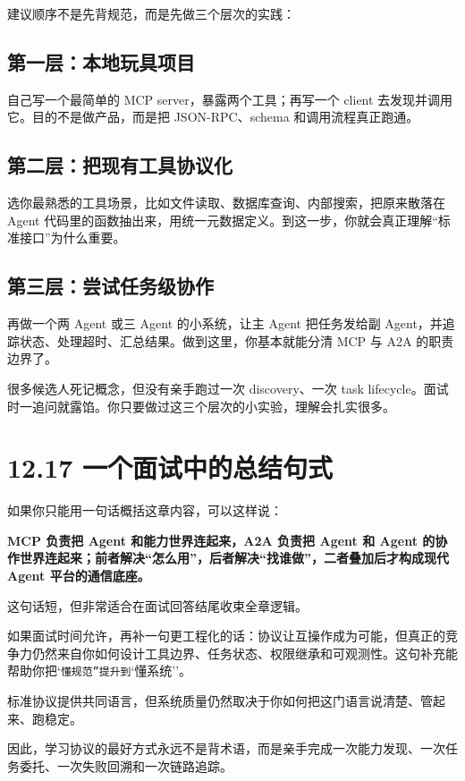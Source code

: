 建议顺序不是先背规范，而是先做三个层次的实践：


\subsection{第一层：本地玩具项目}

自己写一个最简单的 MCP server，暴露两个工具；再写一个 client 去发现并调用它。目的不是做产品，而是把 JSON-RPC、schema 和调用流程真正跑通。


\subsection{第二层：把现有工具协议化}

选你最熟悉的工具场景，比如文件读取、数据库查询、内部搜索，把原来散落在 Agent 代码里的函数抽出来，用统一元数据定义。到这一步，你就会真正理解``标准接口''为什么重要。


\subsection{第三层：尝试任务级协作}

再做一个两 Agent 或三 Agent 的小系统，让主 Agent 把任务发给副 Agent，并追踪状态、处理超时、汇总结果。做到这里，你基本就能分清 MCP 与 A2A 的职责边界了。


很多候选人死记概念，但没有亲手跑过一次 discovery、一次 task lifecycle。面试时一追问就露馅。你只要做过这三个层次的小实验，理解会扎实很多。


\section{12.17 一个面试中的总结句式}

如果你只能用一句话概括这章内容，可以这样说：

\textbf{MCP 负责把 Agent 和能力世界连起来，A2A 负责把 Agent 和 Agent 的协作世界连起来；前者解决“怎么用”，后者解决“找谁做”，二者叠加后才构成现代 Agent 平台的通信底座。}

这句话短，但非常适合在面试回答结尾收束全章逻辑。


如果面试时间允许，再补一句更工程化的话：协议让互操作成为可能，但真正的竞争力仍然来自你如何设计工具边界、任务状态、权限继承和可观测性。这句补充能帮助你把`\texttt{懂规范''提升到}`懂系统''。

标准协议提供共同语言，但系统质量仍然取决于你如何把这门语言说清楚、管起来、跑稳定。

因此，学习协议的最好方式永远不是背术语，而是亲手完成一次能力发现、一次任务委托、一次失败回溯和一次链路追踪。

